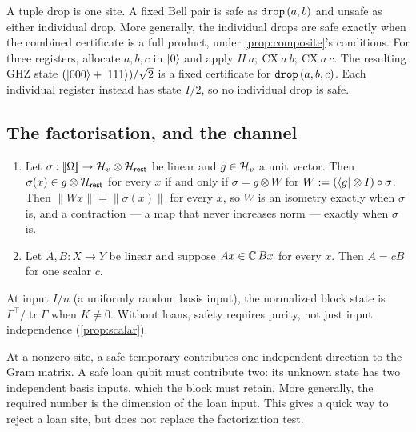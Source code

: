 \documentclass[acmsmall,screen,review,anonymous,nonacm]{acmart}
\begin{document}
A tuple drop is one site. A fixed Bell pair is safe as $\texttt{drop}\,(a,b)$ and
unsafe as either individual drop. More generally, the individual drops
are safe exactly when the combined certificate is a full product, under
\cref{prop:composite}'s conditions. For three registers, allocate $a,b,c$ in $\lvert 0 \rangle$ and apply
$H\ a;\ \mathrm{CX}\ a\ b;\ \mathrm{CX}\ a\ c$.
The resulting GHZ state $(\lvert 000 \rangle+\lvert 111 \rangle)/\sqrt2$ is a fixed
certificate for $\texttt{drop}\,(a,b,c)$. Each individual register instead has
state $I/2$, so no individual drop is safe.

\subsection{The factorisation, and the channel}\label{sec:factor}

\begin{lemma}\label{lem:factor}
\leavevmode
\begin{enumerate}[beginpenalty=10000]
\item Let $\sigma : [\![\Omega]\!] \to \mathcal{H}_{v} \otimes \mathcal{H}_{\mathsf{rest}}$ be linear and
  $g \in \mathcal{H}_{v}$ a unit vector. Then $\sigma(x) \in g \otimes \mathcal{H}_{\mathsf{rest}}$ for every
  $x$ if and only if $\sigma = g \otimes W$ for
  $W := (\langle g \rvert \otimes I) \circ \sigma$. Then $\lVert Wx\rVert =
  \lVert\sigma(x)\rVert$ for every $x$, so $W$ is an isometry exactly when
  $\sigma$ is, and a contraction --- a map that never increases norm --- exactly
  when $\sigma$ is.
\item Let $A, B : X \to Y$ be linear and suppose $Ax \in \mathbb{C}\,Bx$ for
  every $x$. Then $A = cB$ for one scalar $c$.
\end{enumerate}
\end{lemma}

\stmtGram

At input $I/n$ (a uniformly random basis input), the normalized block
state is $\Gamma^\top/\operatorname{tr}\Gamma$ when $K\ne0$. Without loans,
safety requires purity, not just input independence (\cref{prop:scalar}).

At a nonzero site, a safe temporary contributes one independent direction
to the Gram matrix. A safe loan qubit must contribute two: its unknown state has two
independent basis inputs, which the block must retain. More generally,
the required number is the dimension of the loan input. This gives a
quick way to reject a loan site, but does not replace the factorization test.
\end{document}
